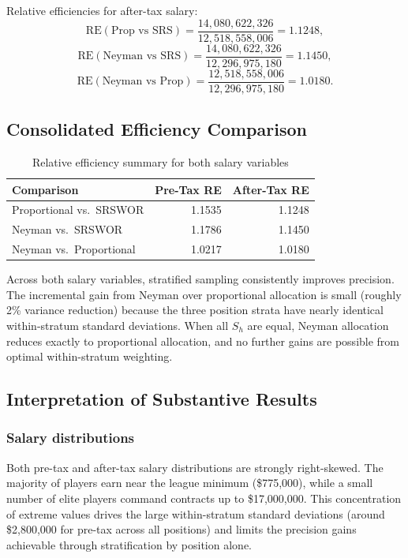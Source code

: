 \documentclass[12pt]{article}
\begin{document}
Relative efficiencies for after-tax salary:
\[
  \mathrm{RE}(\text{Prop vs SRS}) = \frac{14{,}080{,}622{,}326}{12{,}518{,}558{,}006} = 1.1248,
\]
\[
  \mathrm{RE}(\text{Neyman vs SRS}) = \frac{14{,}080{,}622{,}326}{12{,}296{,}975{,}180} = 1.1450,
\]
\[
  \mathrm{RE}(\text{Neyman vs Prop}) = \frac{12{,}518{,}558{,}006}{12{,}296{,}975{,}180} = 1.0180.
\]

\subsection{Consolidated Efficiency Comparison}

\begin{table}[H]
\centering
\caption{Relative efficiency summary for both salary variables}
\label{tab:re_summary}
\begin{tabular}{lrr}
\toprule
Comparison & Pre-Tax RE & After-Tax RE \\
\midrule
Proportional vs.\ SRSWOR & 1.1535 & 1.1248 \\
Neyman vs.\ SRSWOR       & 1.1786 & 1.1450 \\
Neyman vs.\ Proportional & 1.0217 & 1.0180 \\
\bottomrule
\end{tabular}
\end{table}

\noindent Across both salary variables, stratified sampling consistently improves
precision.
The incremental gain from Neyman over proportional allocation is small (roughly 2\%
variance reduction) because the three position strata have nearly identical
within-stratum standard deviations.
When all $S_h$ are equal, Neyman allocation reduces exactly to proportional allocation,
and no further gains are possible from optimal within-stratum weighting.

\subsection{Interpretation of Substantive Results}

\subsubsection*{Salary distributions}

Both pre-tax and after-tax salary distributions are strongly right-skewed.
The majority of players earn near the league minimum (\$775{,}000), while a small
number of elite players command contracts up to \$17{,}000{,}000.
This concentration of extreme values drives the large within-stratum standard
deviations (around \$2{,}800{,}000 for pre-tax across all positions) and limits the
precision gains achievable through stratification by position alone.
\end{document}
